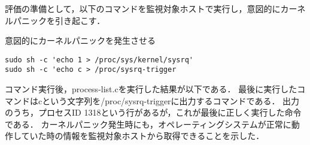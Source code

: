 評価の準備として，以下のコマンドを監視対象ホストで実行し，意図的にカーネルパニックを引き起こす．

\begin{itembox}[l]{意図的にカーネルパニックを発生させる}
    \begin{verbatim}
sudo sh -c 'echo 1 > /proc/sys/kernel/sysrq'
sudo sh -c 'echo c > /proc/sysrq-trigger
    \end{verbatim}
\end{itembox}

コマンド実行後，process-list.cを実行した結果が以下である．
最後に実行したコマンドはcという文字列を/proc/sysrq-triggerに出力するコマンドである．
出力のうち，プロセスID 1318という行があるが，これが最後に正しく実行した命令である．
カーネルパニック発生時にも，オペレーティングシステムが正常に動作していた時の情報を監視対象ホストから取得できることを示した．


